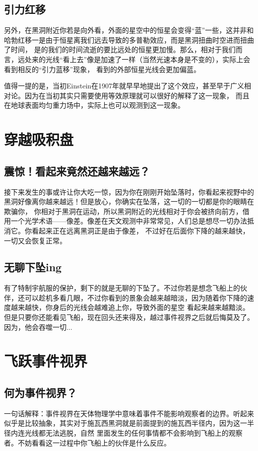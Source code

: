 \documentclass{ctexart}
\begin{document}
    \subsection{引力红移}
    另外，在黑洞附近你若是向外看，外面的星空中的恒星会变得“蓝”一些，这并非和哈勃红移一是由于恒星离我们远去导致的多普勒效应，而是黑洞扭曲时空进而扭曲了时间，
    是的我们的时间流逝的要比远处的恒星更加慢。那么，相对于我们而言，远处来的光线“看上去”像是加速了一样（当然光速本身是不变的），实际上会看到相反的“引力蓝移”现象，
    看到的外部恒星光线会更加偏蓝。\cite{florides2002einstein}
    
    值得一提的是，当初Einstein在1907年就早早地提出了这个效应，甚至早于广义相对论。\cite{valente2018einstein}因为在当初其实只需要使用等效原理就可以很好的解释了这一现象，
    而且在地球表面均匀重力场中，实际上也可以观测到这一现象。\cite{pound1959gravitational}
    \section{穿越吸积盘}
    \subsection{震惊！看起来竟然还越来越远？}
    接下来发生的事或许让你大吃一惊，因为你在刚刚开始坠落时，你看起来视野中的黑洞好像离你越来越远！但是放心，你确实在坠落，这一切的一切都是你的眼睛在欺骗你，
    你相对于黑洞在运动，所以黑洞附近的光线相对于你会被挤向前方，借用一个光学术语——像差。\cite{chang2020black}像差在天文观测中非常常见，人们总是想尽一切办法抵消它。你看起来正在远离黑洞正是由于像差，
    不过好在后面你下降的越来越快，一切又会恢复正常。
    \subsection{无聊下坠ing}
    有了特制宇航服的保护，剩下的就是无聊的下坠了。不过你若是想念飞船上的伙伴，还可以趁机多看几眼，不过你看到的景象会越来越暗淡，因为随着你下降的速度越来越快，你身后的光线会越难追上你，导致外面的星空
    看起来越来越黯淡。但是只要你还能看见飞船，现在回头还来得及，越过事件视界之后就后悔莫及了。因为，他会吞噬一切$\ldots$
    \section{飞跃事件视界}
    \subsection{何为事件视界？}
    一句话解释：事件视界在天体物理学中意味着事件不能影响观察者的边界。听起来似乎是比较抽象，其实对于施瓦西黑洞就是前面提到的施瓦西半径内，因为这一半径内连光线都无法逃脱，自然
    里面发生的任何事情都不会影响到飞船上的观察者。不妨看看这一过程中你飞船上的伙伴是什么反应。
\end{document}
